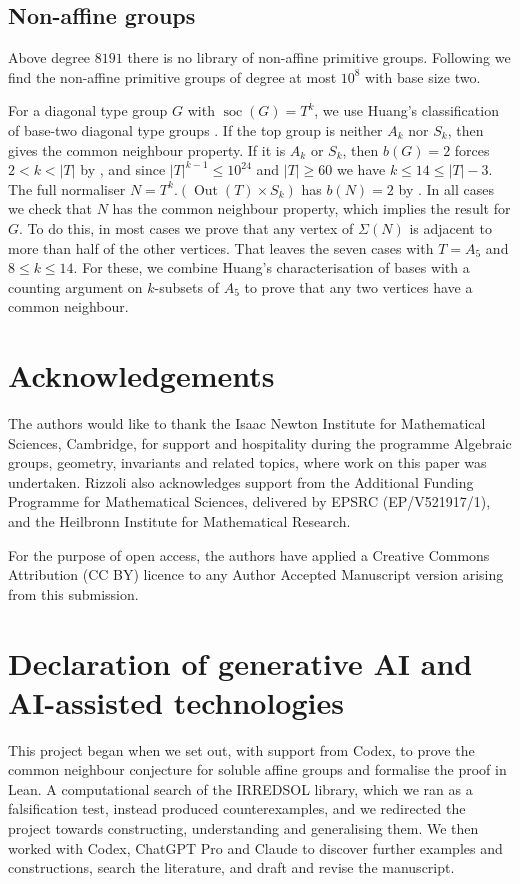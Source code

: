 \documentclass[a4paper,reqno,11pt]{amsart}
\numberwithin{equation}{section}
\begin{document}
\subsection{Non-affine groups}

Above degree $8191$ there is no library of non-affine primitive groups. Following \cite{St} we find the non-affine primitive groups of degree at most $10^8$ with base size two.

For a diagonal type group $G$ with $\operatorname{soc}(G)=T^k$, we use Huang's classification of base-two diagonal type groups \cite[Theorem~1]{Hu}. If the top group is neither $A_k$ nor $S_k$, then \cite[Theorem~5.6]{HuT} gives the common neighbour property. If it is $A_k$ or $S_k$, then $b(G)=2$ forces $2<k<|T|$ by \cite[Corollary~2.4]{Hu}, and since $|T|^{k-1}\le 10^{24}$ and $|T|\ge60$ we have $k\le14 \le |T|-3$. The full normaliser $N=T^k.(\operatorname{Out}(T)\times S_k)$ has $b(N)=2$ by \cite[Theorem~1(ii)]{Hu}. In all cases we check that $N$ has the common neighbour property, which implies the result for $G$. To do this, in most cases we prove that any vertex of $\Sigma(N)$ is adjacent to more than half of the other vertices. That leaves the seven cases with $T=A_5$ and $8\le k\le14$. For these, we combine Huang's characterisation of bases \cite[Lemmas~2.15 and~2.16]{Hu} with a counting argument on $k$-subsets of $A_5$ to prove that any two vertices have a common neighbour.

\pagebreak

\section*{Acknowledgements}
The authors would like to thank the Isaac Newton Institute for Mathematical Sciences, Cambridge, for support and hospitality during the programme Algebraic groups, geometry, invariants and related topics, where work on this paper was undertaken. Rizzoli also acknowledges support from the Additional Funding Programme for Mathematical Sciences, delivered by EPSRC (EP/V521917/1), and the Heilbronn Institute for Mathematical Research.

For the purpose of open access, the authors have applied a Creative Commons Attribution (CC BY) licence to any Author Accepted Manuscript version arising from this submission.

\section*{Declaration of generative AI and AI-assisted technologies}
This project began when we set out, with support from Codex, to prove the common neighbour conjecture for soluble affine groups and formalise the proof in Lean. A computational search of the IRREDSOL library, which we ran as a falsification test, instead produced counterexamples, and we redirected the project towards constructing, understanding and generalising them. We then worked with Codex, ChatGPT Pro and Claude to discover further examples and constructions, search the literature, and draft and revise the manuscript.
\end{document}
